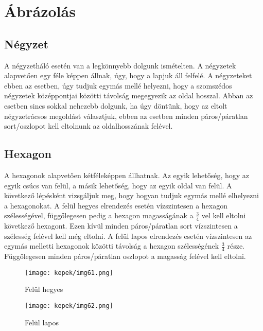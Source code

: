 \chapter{Ábrázolás}

\section{Négyzet}

A négyzetháló esetén van a legkönnyebb dolgunk ismételten. A négyzetek alapvetően egy féle képpen állnak, úgy, hogy a lapjuk áll felfelé.  A négyzeteket ebben az esetben, úgy tudjuk egymás mellé helyezni, hogy a szomszédos négyzetek középpontjai közötti távolság megegyezik az oldal hosszal. 
\newline
\newline Abban az esetben sincs sokkal nehezebb dolgunk, ha úgy döntünk, hogy az eltolt négyzetrácsos megoldást választjuk, ebben az esetben minden páros/páratlan sort/oszlopot kell eltolnunk az oldalhosszának felével.

\section{Hexagon}

A hexagonok alapvetően kétféleképpen állhatnak. Az egyik lehetőség, hogy az egyik csúcs van felül, a másik lehetőség, hogy az egyik oldal van felül. 
\newline
\newline A következő lépésként vizsgáljuk meg, hogy hogyan tudjuk egymás mellé elhelyezni a hexagonokat.
\newline
\newline A felül hegyes elrendezés esetén vízszintesen a hexagon szélességével, függőlegesen pedig a hexagon magasságának a $\frac{3}{4}$ vel kell eltolni következő hexagont. Ezen kívül minden páros/páratlan sort vízszintesen a szélesség felével kell még eltolni.
\newline
\newline A felül lapos elrendezés esetén vízszintesen az egymás melletti hexagonok közötti távolság a hexagon szélességének $\frac{3}{4}$ része. Függőlegesen minden páros/páratlan oszlopot a magasság felével kell eltolni.

\begin{figure}[h]
\centering
\texttt{[image: kepek/img61.png]}
\caption{Felül hegyes}
\label{fig:img61}
\end{figure}

\begin{figure}[h]
\centering
\texttt{[image: kepek/img62.png]}
\caption{Felül lapos}
\label{fig:img62}
\end{figure}
